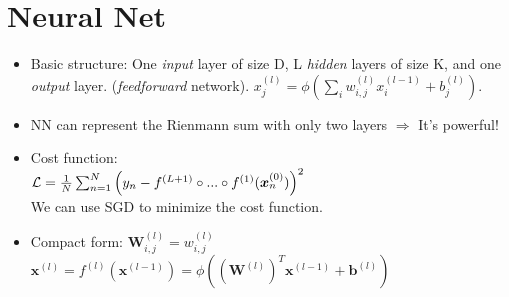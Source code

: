 \section{Neural Net}
\begin{itemize}
	\item Basic structure: 
	One \emph{input} layer of size D, L \emph{hidden} layers of size K, and one \emph{output} layer. (\emph{feedforward} network). $x_j^{(l)} = \phi\left(\sum_i w_{i,j}^{(l)}x_i^{(l-1)} + b_j^{(l)} \right)$.
	\item NN can represent the Rienmann sum with only two layers $\Rightarrow$ It's powerful!
	\item Cost function: \\$\mathcal{L} = \frac{1}{N} \sum_{n=1}^N\left( y_n - f^{(L+1)} \circ ... \circ f^{(1)}(\bm x_n^{(0)})\right)^2$ \\
	We can use SGD to minimize the cost function.
	\item Compact form: $\bm W_{i,j}^{(l)} = w_{i,j}^{(l)}$ \\
	$\bm x^{(l)} = f^{(l)}(\bm x^{(l-1)}) = \phi\left( \left(\bm W^{(l)}\right)^T\bm x^{(l-1)} + \bm b^{(l)}\right)$
\end{itemize}


